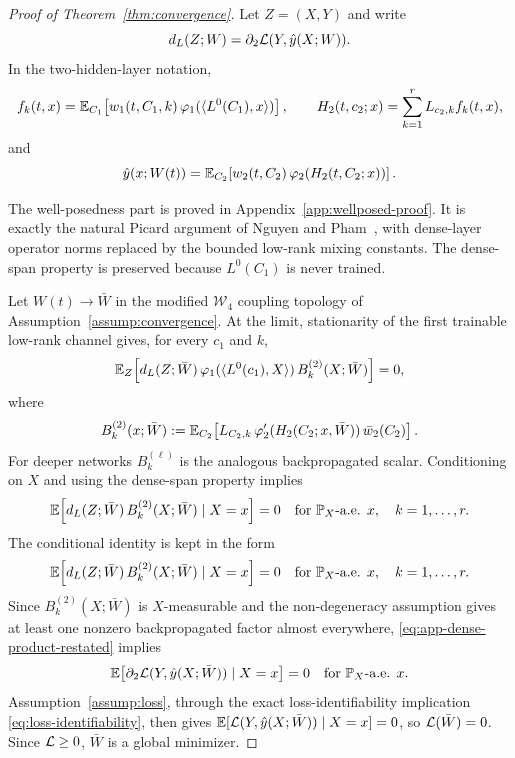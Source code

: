 \begin{proof}[Proof of Theorem~\ref{thm:convergence}]
Let $Z=(X,Y)$ and write
\begin{equation}
d_L(Z;W)=\partial_2\mathcal{L}(Y,\hat y(X;W)).
\end{equation}
In the two-hidden-layer notation,
\begin{equation}
f_k(t,x)=
\mathbb{E}_{C_1}\!\left[
w_1(t,C_1,k)\,
\varphi_1(\langle L^0(C_1),x\rangle)
\right],
\qquad
H_2(t,c_2;x)=\sum_{k=1}^r L_{c_2,k}f_k(t,x),
\end{equation}
and
\begin{equation}
\hat y(x;W(t))=
\mathbb{E}_{C_2}\!\left[
w_2(t,C_2)\,
\varphi_2(H_2(t,C_2;x))
\right].
\end{equation}

The well-posedness part is proved in Appendix~\ref{app:wellposed-proof}. It is exactly the natural Picard argument of Nguyen and Pham~\cite{nguyen2023}, with dense-layer operator norms replaced by the bounded low-rank mixing constants. The dense-span property is preserved because $L^0(C_1)$ is never trained.

Let $W(t)\to\bar W$ in the modified $\mathcal W_4$ coupling topology of Assumption~\ref{assump:convergence}. At the limit, stationarity of the first trainable low-rank channel gives, for every $c_1$ and $k$,
\begin{equation}
\mathbb{E}_Z\!\left[
d_L(Z;\bar W)\,
\varphi_1(\langle L^0(c_1),X\rangle)\,
B_k^{(2)}(X;\bar W)
\right]=0,
\label{eq:app-first-stationary}
\end{equation}
where
\begin{equation}
B_k^{(2)}(x;\bar W)
:=
\mathbb{E}_{C_2}\!\left[
L_{C_2,k}\,
\varphi_2'(H_2(C_2;x,\bar W))\,
\bar w_2(C_2)
\right].
\label{eq:app-Bk}
\end{equation}
For deeper networks $B_k^{(\ell)}$ is the analogous backpropagated scalar. Conditioning on $X$ and using the dense-span property implies
\begin{equation}
\mathbb{E}\!\left[
d_L(Z;\bar W)\,
B_k^{(2)}(X;\bar W)
\mid X=x
\right]=0
\quad\text{for }\mathbb{P}_X\text{-a.e. }x,\quad k=1,\ldots,r .
\label{eq:app-dense-product}
\end{equation}
The conditional identity is kept in the form
\begin{equation}
\mathbb{E}\!\left[
d_L(Z;\bar W)\,
B_k^{(2)}(X;\bar W)
\mid X=x
\right]=0
\quad\text{for }\mathbb{P}_X\text{-a.e. }x,\quad k=1,\ldots,r .
\label{eq:app-dense-product-restated}
\end{equation}
Since $B_k^{(2)}(X;\bar W)$ is $X$-measurable and the non-degeneracy assumption gives at least one nonzero backpropagated factor almost everywhere, \eqref{eq:app-dense-product-restated} implies
\begin{equation}
\mathbb{E}\!\left[
\partial_2\mathcal{L}(Y,\hat y(X;\bar W))
\mid X=x
\right]=0
\quad\text{for }\mathbb{P}_X\text{-a.e. }x .
\label{eq:app-conditional-zero}
\end{equation}
Assumption~\ref{assump:loss}, through the exact loss-identifiability implication \eqref{eq:loss-identifiability}, then gives $\mathbb{E}[\mathcal{L}(Y,\hat y(X;\bar W))\mid X=x]=0$, so $\mathcal{L}(\bar W)=0$. Since $\mathcal{L}\ge0$, $\bar W$ is a global minimizer.


\end{proof}
